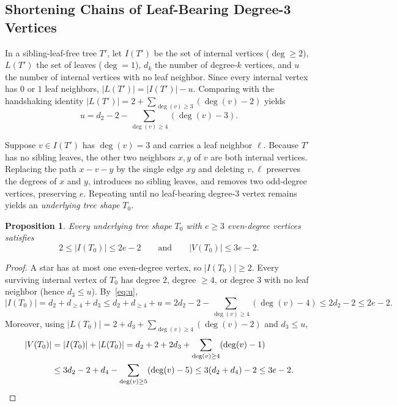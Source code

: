 \documentclass[11pt]{article}
\newtheorem{proposition}[theorem]{Proposition}
\theoremstyle{definition}
\begin{document}
\subsection{Shortening Chains of Leaf-Bearing Degree-3 Vertices}
In a sibling-leaf-free tree $T'$, let $I(T')$ be the set of internal vertices ($\deg \ge 2$), $L(T')$ the set of leaves ($\deg = 1$), $d_k$ the number of degree-$k$ vertices, and $u$ the number of internal vertices with no leaf neighbor. Since every internal vertex has $0$ or $1$ leaf neighbors, $|L(T')| = |I(T')| - u$. Comparing with the handshaking identity $|L(T')| = 2 + \sum_{\deg(v) \ge 3}(\deg(v) - 2)$ yields
\begin{equation}\label{eq:u}
u = d_2 - 2 - \sum_{\deg(v) \ge 4} (\deg(v) - 3).
\end{equation}

Suppose $v \in I(T')$ has $\deg(v) = 3$ and carries a leaf neighbor $\ell$. Because $T'$ has no sibling leaves, the other two neighbors $x, y$ of $v$ are both internal vertices. Replacing the path $x - v - y$ by the single edge $xy$ and deleting $v, \ell$ preserves the degrees of $x$ and $y$, introduces no sibling leaves, and removes two odd-degree vertices, preserving $e$. Repeating until no leaf-bearing degree-$3$ vertex remains yields an \emph{underlying tree shape} $T_0$.

\begin{proposition}\label{prop:shape-bounds}
Every underlying tree shape $T_0$ with $e \ge 3$ even-degree vertices satisfies
\[
2 \le |I(T_0)| \le 2e - 2 \qquad \text{and} \qquad |V(T_0)| \le 3e - 2.
\]
\end{proposition}

\begin{proof}
A star has at most one even-degree vertex, so $|I(T_0)| \ge 2$. Every surviving internal vertex of $T_0$ has degree $2$, degree $\ge 4$, or degree $3$ with no leaf neighbor (hence $d_3 \le u$). By~\eqref{eq:u},
\[
|I(T_0)| = d_2 + d_{\ge 4} + d_3 \le d_2 + d_{\ge 4} + u = 2d_2 - 2 - \sum_{\deg(v) \ge 4}(\deg(v) - 4) \le 2d_2 - 2 \le 2e - 2.
\]
Moreover, using $|L(T_0)| = 2 + d_3 + \sum_{\deg(v) \ge 4}(\deg(v) - 2)$ and $d_3 \le u$,
\begin{align*}
|V(T_0)| &= |I(T_0)| + |L(T_0)| = d_2 + 2 + 2d_3 + \sum_{\deg(v) \ge 4}(\deg(v) - 1) \\
&\le 3d_2 - 2 + d_4 - \sum_{\deg(v) \ge 5}(\deg(v) - 5) \le 3(d_2 + d_4) - 2 \le 3e - 2. \qedhere
\end{align*}
\end{proof}
\end{document}
